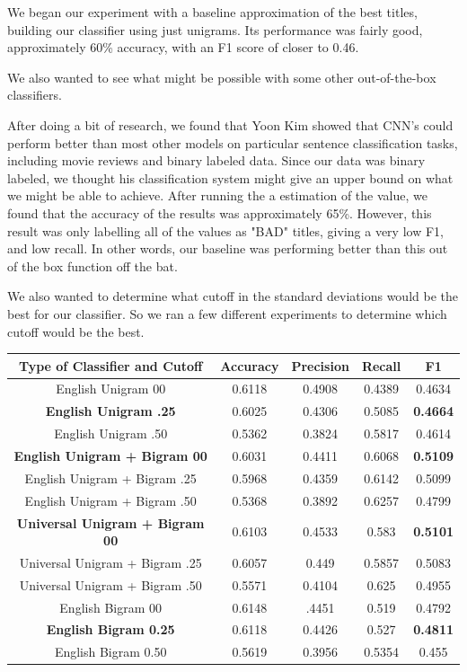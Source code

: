 \documentclass[a4paper,12pt]{article}
\begin{document}
We began our experiment with a baseline approximation of the best titles, building our classifier using just unigrams. Its performance was fairly good, approximately 60\% accuracy, with an F1 score of closer to 0.46.

We also wanted to see what might be possible with some other out-of-the-box classifiers.

After doing a bit of research, we found that  Yoon Kim showed that CNN's could perform better than most other models on particular sentence classification tasks, including movie reviews and binary labeled data. Since our data was binary labeled, we thought his classification system might give an upper bound on what we might be able to achieve. After running the a estimation of the value, we found that the accuracy of the results was approximately 65\%. However, this result was only labelling all of the values as "BAD" titles, giving a very low F1, and low recall. In other words, our baseline was performing better than this out of the box function off the bat.

We also wanted to determine what cutoff in the standard deviations would be the best for our classifier. So we ran a few different experiments to determine which cutoff would be the best. 
 
\begin{center}
 \begin{tabular}{|c| c| c| c| c|} 
 \hline
 Type of Classifier and Cutoff & Accuracy & Precision & Recall & F1 \\ [0.5ex] 
 \hline
 English Unigram 00 & 0.6118  & 0.4908  &0.4389  & 0.4634\\ 
 \hline
 \textbf{English Unigram .25} &  0.6025& 0.4306  & 0.5085  & \textbf{0.4664}\\ 
\hline
 English Unigram .50 & 0.5362  & 0.3824  & 0.5817  & 0.4614\\ 
\hline
  \hline
\textbf{ English Unigram + Bigram 00}& 0.6031  & 0.4411  & 0.6068  &\textbf{0.5109}\\
 \hline
 English Unigram + Bigram .25& 0.5968  & 0.4359  & 0.6142  &0.5099\\
\hline
 English Unigram + Bigram .50& 0.5368  & 0.3892  & 0.6257  &0.4799\\
\hline
 \hline
 \textbf{ Universal Unigram + Bigram 00}& 0.6103  & 0.4533  & 0.583  &\textbf{0.5101}\\
 \hline
 Universal Unigram + Bigram .25& 0.6057  & 0.449  & 0.5857  &0.5083\\
\hline
 Universal Unigram + Bigram .50& 0.5571  & 0.4104  & 0.625  &0.4955\\
\hline
 \hline
English Bigram 00 & 0.6148  & .4451  & 0.519  &0.4792\\
\hline
\textbf{English Bigram  0.25}& 0.6118  & 0.4426  & 0.527  &\textbf{0.4811}\\
\hline
English Bigram 0.50 & 0.5619  & 0.3956  & 0.5354  & 0.455\\
\hline

\end{tabular}
\end{center}
\end{document}
